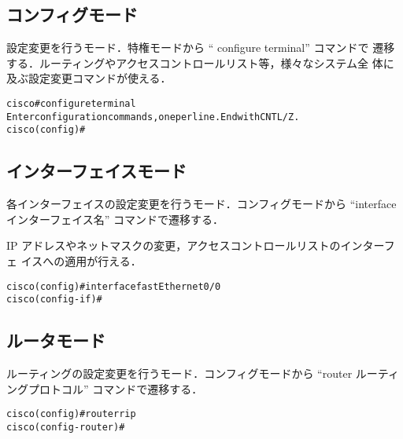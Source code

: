 \subsection*{コンフィグモード}

設定変更を行うモード．特権モードから `` configure terminal'' コマンドで
遷移する．ルーティングやアクセスコントロールリスト等，様々なシステム全
体に及ぶ設定変更コマンドが使える．

\begin{center}
\begin{screen}
\begin{alltt}
cisco#configure terminal
Enter configuration commands, one per line.  End with CNTL/Z.
cisco(config)#
\end{alltt}
\end{screen}
\end{center}

\subsection*{インターフェイスモード}

各インターフェイスの設定変更を行うモード．コンフィグモードから
``interface インターフェイス名'' コマンドで遷移する．

IP アドレスやネットマスクの変更，アクセスコントロールリストのインターフェ
イスへの適用が行える．

\begin{center}
\begin{screen}
\begin{alltt}
cisco(config)#interface fastEthernet 0/0
cisco(config-if)#
\end{alltt}
\end{screen}
\end{center}

\subsection*{ルータモード}

ルーティングの設定変更を行うモード．コンフィグモードから
``router ルーティングプロトコル'' コマンドで遷移する．

\begin{center}
\begin{screen}
\begin{alltt}
cisco(config)#router rip
cisco(config-router)#
\end{alltt}
\end{screen}
\end{center}

